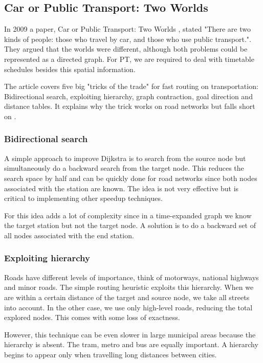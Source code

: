 \subsection{Car or Public Transport: Two Worlds}
In 2009 a paper, Car or Public Transport: Two Worlds \cite{bast_car_2009}, stated "There are two kinds of people: those who travel by car, and those who use public transport.". They argued that the worlds were different, although both problems could be represented as a directed graph. For PT, we are required to deal with timetable schedules besides this spatial information.

The article covers five big "tricks of the trade" for fast routing on transportation: Bidirectional search, exploiting hierarchy, graph contraction, goal direction and distance tables. It explains why the trick works on road networks but falls short on .

\subsubsection{Bidirectional search}
A simple approach to improve Dijkstra is to search from the source node but simultaneously do a backward search from the target node. This reduces the search space by half and can be quickly done for road networks since both nodes associated with the station are known. The idea is not very effective but is critical to implementing other speedup techniques.

For  this idea adds a lot of complexity since in a time-expanded graph we know the target station but not the target node. A solution is to do a backward set of all nodes associated with the end station.
\subsubsection{Exploiting hierarchy}
Roads have different levels of importance, think of motorways, national highways and minor roads. The simple routing heuristic exploits this hierarchy. When we are within a certain distance of the target and source node, we take all streets into account. In the other case, we use only high-level roads, reducing the total explored nodes. This comes with some loss of exactness.

However, this technique can be even slower in large municipal areas because the hierarchy is absent. The tram, metro and bus are equally important. A hierarchy begins to appear only when travelling long distances between cities. 
